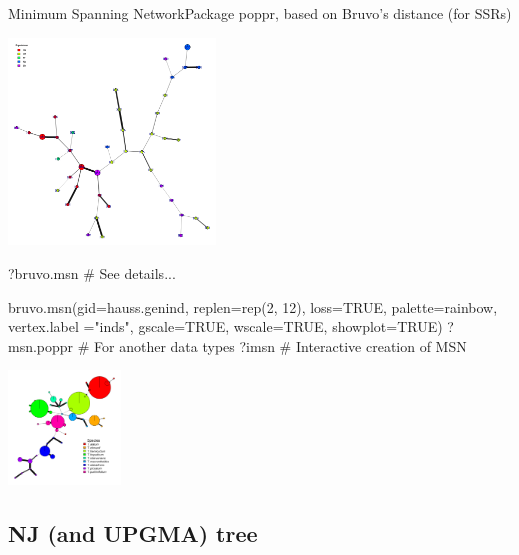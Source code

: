 \documentclass[compress, ucs, xelatex, 11pt, xcolor=svgnames,
	hyperref={
		bookmarks=true,
		unicode=true,
		colorlinks=true,
		pdftitle={Molecular data in R},
		plainpages=false,
		pdfauthor={Vojtech Zeisek},
		pdfsubject={Course about phylogeny and evolution in R},
		pdfcreator={XeLaTeX},
		pdfkeywords={R, evolution, phylogeny, molecular data},
		linkcolor=Tomato,
		anchorcolor=SaddleBrown,
		citecolor=Goldenrod,
		filecolor=DarkMagenta,
		menucolor=Sienna,
		urlcolor=DarkTurquoise,
		pdftex},
	url={hyphens, lowtilde} %
	]{beamer}
\begin{document}
\begin{frame}[fragile]{Minimum Spanning Network}{Package poppr, based on Bruvo's distance (for SSRs)}
	\label{MSN}
	\begin{multicols}{2}
		\begin{center}
			\includegraphics[height=5.5cm]{msn.png}
		\end{center}
		\begin{spluscode}
    ?bruvo.msn # See details...
		\end{spluscode}
		\columnbreak
		\begin{spluscode}
    bruvo.msn(gid=hauss.genind,
      replen=rep(2, 12), loss=TRUE,
      palette=rainbow, vertex.label
      ="inds", gscale=TRUE,
      wscale=TRUE, showplot=TRUE)
    ?msn.poppr # For another data types
    ?imsn # Interactive creation of MSN
		\end{spluscode}
		\begin{center}
			\includegraphics[width=3cm]{msn-bruvo_no_labels.png}
		\end{center}
	\end{multicols}
\end{frame}

\subsection{NJ (and UPGMA) tree}
\end{document}
